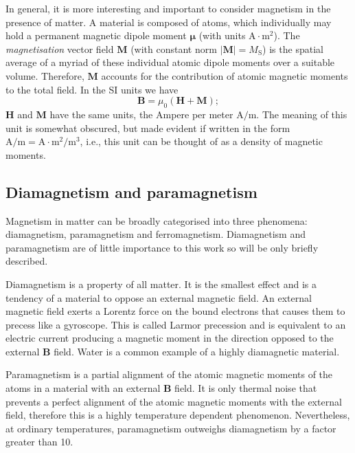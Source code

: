 In general, it is more interesting and important to consider magnetism in the presence of matter. A material is composed of atoms, which individually may hold a permanent magnetic dipole moment $\boldsymbol{\mu}$ (with units $\text{A}\cdot \text{m}^2$). The \textit{magnetisation} vector field $\boldsymbol{M}$ (with constant norm $|\boldsymbol{M}|=M_\text{S}$) is the spatial average of a myriad of these individual atomic dipole moments over a suitable volume. Therefore, $\boldsymbol{M}$ accounts for the contribution of atomic magnetic moments to the total field. In the SI units we have
\begin{equation}
\boldsymbol{B} = \mu_0 (\boldsymbol{H}+\boldsymbol{M});
\end{equation}
$\boldsymbol{H}$ and $\boldsymbol{M}$ have the same units, the Ampere per meter $\text{A}/\text{m}$. The meaning of this unit is somewhat obscured, but made evident if written in the form $\text{A}/\text{m} = \text{A}\cdot\text{m}^2/\text{m}^3$, i.e., this unit can be thought of as a density of magnetic moments.\par

\subsection{Diamagnetism and paramagnetism}
Magnetism in matter can be broadly categorised into three phenomena: diamagnetism, paramagnetism and ferromagnetism. Diamagnetism and paramagnetism are of little importance to this work so will be only briefly described.\par

Diamagnetism is a property of all matter. It is the smallest effect and is a tendency of a material to oppose an external magnetic field. An external magnetic field exerts a Lorentz force on the bound electrons that causes them to precess like a gyroscope. This is called Larmor precession and is equivalent to an electric current producing a magnetic moment in the direction opposed to the external $\boldsymbol{B}$ field. Water is a common example of a highly diamagnetic material.\par

Paramagnetism is a partial alignment of the atomic magnetic moments of the atoms in a material with an external $\boldsymbol{B}$ field. It is only thermal noise that prevents a perfect alignment of the atomic magnetic moments with the external field, therefore this is a highly temperature dependent phenomenon. Nevertheless, at ordinary temperatures, paramagnetism outweighs diamagnetism by a factor greater than 10.\par

